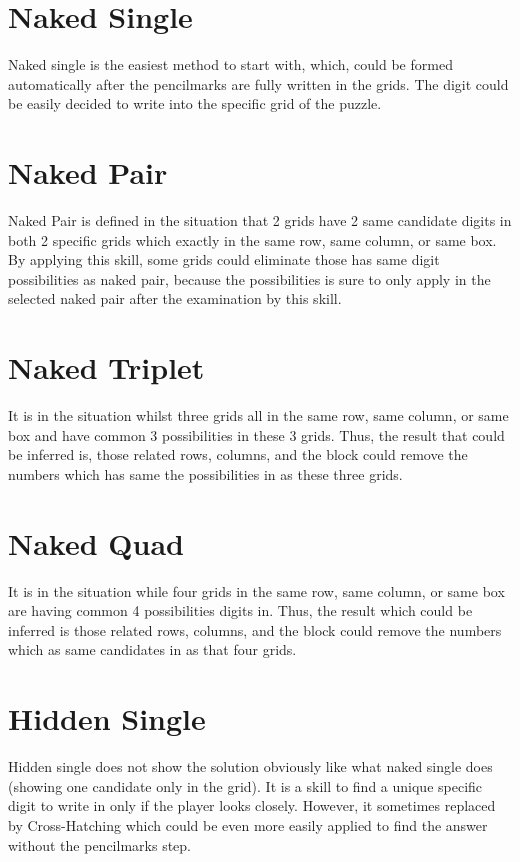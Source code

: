 \documentclass[11pt]{report}
\begin{document}
\section{Naked Single}
\label{sec:Naked Single}

Naked single is the easiest method to start with, which, could be formed automatically after the pencilmarks are fully written in the grids. The digit could be easily decided to write into the specific grid of the puzzle.

\section{Naked Pair}
\label{sec:Naked Pair}

Naked Pair is defined in the situation that 2 grids have 2 same candidate digits in both 2 specific grids which exactly in the same row, same column, or same box. By applying this skill, some grids could eliminate those has same digit possibilities as naked pair, because the possibilities is sure to only apply in the selected naked pair after the examination by this skill.

\section{Naked Triplet}
\label{sec:Naked Triplet}
It is in the situation whilst three grids all in the same row, same column, or same box and have common 3 possibilities in these 3 grids. Thus, the result that could be inferred is, those related rows, columns, and the block could remove the numbers which has same the possibilities in as these three grids.

\section{Naked Quad}
\label{sec:Naked Quad}
It is in the situation while four grids in the same row, same column, or same box are having common 4 possibilities digits in. Thus, the result which could be inferred is those related rows, columns, and the block could remove the numbers which as same candidates in as that four grids.

\section{Hidden Single}
\label{sec:Hidden Single}
Hidden single does not show the solution obviously like what naked single does (showing one candidate only in the grid). It is a skill to find a unique specific digit to write in only if the player looks closely. However, it sometimes replaced by Cross-Hatching which could be even more easily applied to find the answer without the pencilmarks step. 
\end{document}
